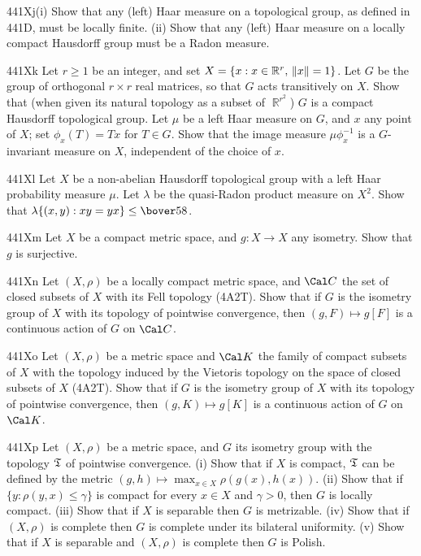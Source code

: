 {\spheader 441Xj(i) Show that any (left) Haar measure on a topological
group, as defined in 441D, must be locally finite.   (ii) Show that any
(left) Haar measure on a locally compact Hausdorff group must be a Radon
measure.

\spheader 441Xk Let $r\ge 1$ be an integer, and set
$X=\{x:x\in\Bbb R^r,\,\|x\|=1\}$.   Let $G$ be the group of orthogonal
$r\times r$ real
matrices, so that $G$ acts transitively on $X$.   Show that (when given
its natural topology as a subset of $\BbbR^{r^2}$) $G$ is a compact
Hausdorff topological group.   Let $\mu$ be a left Haar measure on $G$,
and $x$ any point of $X$;  set $\phi_x(T)=Tx$ for $T\in G$.   Show that
the image measure
$\mu\phi_x^{-1}$ is a $G$-invariant measure on $X$, independent of the
choice of $x$.

\spheader 441Xl Let $X$ be a non-abelian Hausdorff
topological group with a left Haar probability measure $\mu$.   Let
$\lambda$ be the quasi-Radon product measure on $X^2$.   Show that
$\lambda\{(x,y):xy=yx\}\le\bover58$.   

\spheader 441Xm Let $X$ be a compact metric space, and $g:X\to X$ any
isometry.   Show that $g$ is surjective.   

\spheader 441Xn Let $(X,\rho)$ be a locally compact metric space,
and $\Cal C$ the set of closed subsets of $X$ with its Fell
topology (4A2T).   Show that if $G$ is the isometry group of $X$ with
its topology of pointwise convergence, then $(g,F)\mapsto g[F]$
is a continuous action of $G$ on $\Cal C$.

\spheader 441Xo Let $(X,\rho)$ be a metric space and $\Cal K$ the family
of compact subsets of $X$ with the topology induced by
the Vietoris topology on the space of closed subsets of $X$ (4A2T).
Show that if $G$ is the isometry group of $X$ with its topology of
pointwise convergence, then $(g,K)\mapsto g[K]$ is a continuous
action of $G$ on $\Cal K$.

\sqheader 441Xp Let $(X,\rho)$ be a metric space, and $G$ its isometry
group with the topology $\frak T$ of pointwise convergence.   (i) Show
that if $X$ is compact, $\frak T$ can
be defined by the metric $(g,h)\mapsto\max_{x\in X}\rho(g(x),h(x))$.
(ii) Show that if
$\{y:\rho(y,x)\le\gamma\}$ is compact for every $x\in X$ and $\gamma>0$,
then $G$ is locally compact.   (iii) Show that if $X$ is separable then
$G$ is metrizable.   (iv) Show that if $(X,\rho)$ is complete then
$G$ is complete under its bilateral uniformity.
(v) Show that if $X$ is separable and $(X,\rho)$
is complete then $G$ is Polish.

}
